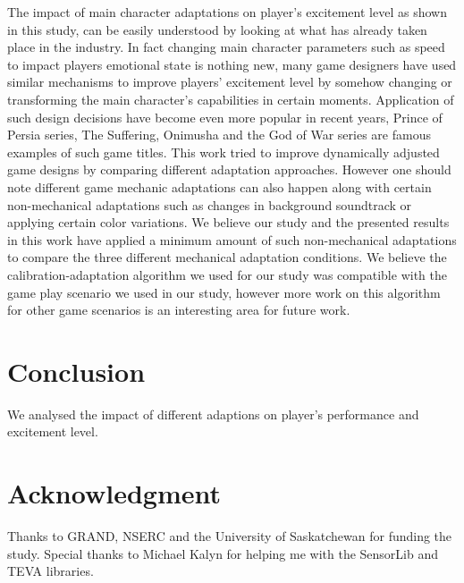 \documentclass[conference]{IEEEtran}
\begin{document}
The impact of main character adaptations on player's excitement level as shown in this study, can be easily understood by looking at what has already taken place in the industry. In fact changing main character parameters such as speed to impact players emotional state is nothing new, many game designers have used similar mechanisms to improve players' excitement level by somehow changing or transforming the main character's capabilities in certain moments. Application of such design decisions have become even more popular in recent years, Prince of Persia series, The Suffering, Onimusha and the God of War series are famous examples of such game titles. This work tried to improve dynamically adjusted game designs by comparing different adaptation approaches. However one should note different game mechanic adaptations can also happen along with certain non-mechanical adaptations such as changes in background soundtrack or applying certain color variations. We believe our study and the presented results in this work have applied a minimum amount of such non-mechanical adaptations to compare the three different mechanical adaptation conditions. We believe the calibration-adaptation algorithm we used for our study was compatible with the game play scenario we used in our study, however more work on this algorithm for other game scenarios is an interesting area for future work.


\section{Conclusion}
\label{sec:conclusion}
We analysed the impact of different adaptions on player's performance and excitement level.


\section*{Acknowledgment}
Thanks to GRAND, NSERC and the University of Saskatchewan for funding the study. Special thanks to Michael Kalyn for helping me with the SensorLib and TEVA libraries.




\end{document}
